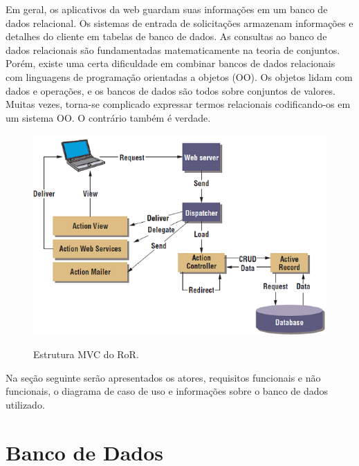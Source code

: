 Em geral, os aplicativos da web guardam suas informações em um banco de dados relacional. Os sistemas de entrada de solicitações armazenam informações e detalhes do cliente em tabelas de banco de dados. As consultas ao banco de dados relacionais são fundamentadas matematicamente na  teoria de conjuntos. Porém, existe uma certa dificuldade em combinar bancos de dados relacionais com linguagens de programação orientadas a objetos (OO).
Os objetos lidam com dados e operações, e os bancos de dados são todos sobre conjuntos de valores. Muitas vezes, torna-se complicado expressar termos relacionais  codificando-os em um sistema OO. O contrário também é verdade. 

\begin{figure}[h]
	\caption{Estrutura MVC do RoR.}
	
	\centering %
	\includegraphics{Figs/frameworkRuby.png} %
	\label{figura:frameworkRuby}
\end{figure}

Na seção seguinte serão apresentados os atores, requisitos funcionais e não funcionais, o diagrama de caso de uso e informações sobre o banco de dados utilizado.

\section{Banco de Dados}


